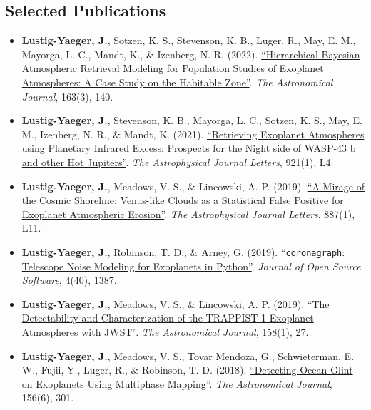 \documentclass[margin,10pt]{res}
\begin{document}
\begin{resume}
\section{Selected Publications} 
                \begin{itemize}
                    \item \textbf{Lustig-Yaeger, J.}, Sotzen, K. S., Stevenson, K. B., Luger, R., May, E. M., Mayorga, L. C., Mandt, K., \& Izenberg, N. R. (2022). \href{https://doi.org/10.3847/1538-3881/ac5034}{``Hierarchical Bayesian Atmospheric Retrieval Modeling for Population Studies of Exoplanet Atmospheres: A Case Study on the Habitable Zone''}. \textit{The Astronomical Journal}, 163(3), 140. 
                    \item \textbf{Lustig-Yaeger, J.}, Stevenson, K. B., Mayorga, L. C., Sotzen, K. S., May, E. M., Izenberg, N. R., \& Mandt, K. (2021). \href{https://doi.org/10.3847/2041-8213/ac2cc2}{``Retrieving Exoplanet Atmospheres using Planetary Infrared Excess: Prospects for the Night side of WASP-43 b and other Hot Jupiters''}. \textit{The Astrophysical Journal Letters}, 921(1), L4.
                    \item \textbf{Lustig-Yaeger, J.}, Meadows, V. S., \& Lincowski, A. P. (2019). \href{https://doi.org/10.3847/2041-8213/ab5965}{``A Mirage of the Cosmic Shoreline: Venus-like Clouds as a Statistical False Positive for Exoplanet Atmospheric Erosion''}. \textit{The Astrophysical Journal Letters}, 887(1), L11. 
                    \item \textbf{Lustig-Yaeger, J.}, Robinson, T. D., \& Arney, G. (2019). \href{https://doi.org/10.21105/joss.01387}{``\texttt{coronagraph}: Telescope Noise Modeling for Exoplanets in Python''}. \textit{Journal of Open Source Software}, 4(40), 1387.
                    \item \textbf{Lustig-Yaeger, J.}, Meadows, V. S., \& Lincowski, A. P. (2019). \href{https://doi.org/10.3847/1538-3881/ab21e0}{``The Detectability and Characterization of the TRAPPIST-1 Exoplanet Atmospheres with JWST''}. \textit{The Astronomical Journal}, 158(1), 27.
                    \item \textbf{Lustig-Yaeger, J.}, Meadows, V. S., Tovar Mendoza, G., Schwieterman, E. W., Fujii, Y., Luger, R., \&  Robinson, T. D. (2018). \href{https://doi.org/10.3847/1538-3881/aaed3a}{``Detecting Ocean Glint on Exoplanets Using Multiphase Mapping''}. \textit{The Astronomical Journal}, 156(6), 301.

\end{itemize}
\end{resume}
\end{document}
